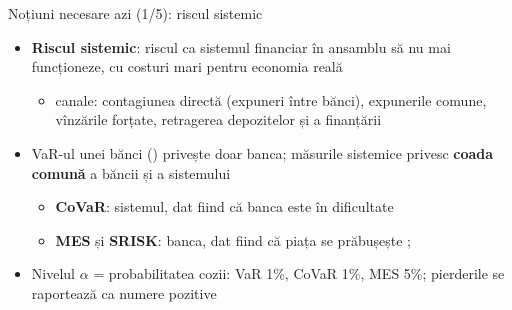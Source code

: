 \begin{frame}{Noțiuni necesare azi (1/5): riscul sistemic}
\itemsize{\small}
\begin{itemize}
    \item \textbf{Riscul sistemic}: riscul ca sistemul financiar în ansamblu să nu mai funcționeze, cu costuri mari pentru economia reală 
    \begin{itemize}
        \item canale: contagiunea directă (expuneri între bănci), expunerile comune, vînzările forțate, retragerea depozitelor și a finanțării
    \end{itemize}
    \item VaR-ul unei bănci () privește doar banca; măsurile sistemice privesc \textbf{coada comună} a băncii și a sistemului
    \begin{itemize}
        \item \textbf{CoVaR}: sistemul, dat fiind că banca este în dificultate 
        \item \textbf{MES} și \textbf{SRISK}: banca, dat fiind că piața se prăbușește ; 
    \end{itemize}
    \item Nivelul $\alpha$ = probabilitatea cozii: VaR 1\%, CoVaR 1\%, MES 5\%; pierderile se raportează ca numere pozitive
\end{itemize}
\end{frame}


